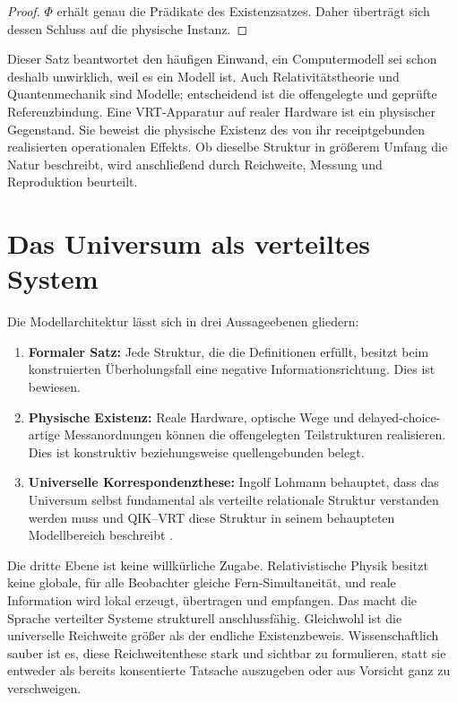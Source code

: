 \documentclass[11pt,a4paper]{article}
\theoremstyle{remark}
\begin{document}
\begin{proof}
\(\Phi\) erhält genau die Prädikate des Existenzsatzes. Daher überträgt sich
dessen Schluss auf die physische Instanz.
\end{proof}

Dieser Satz beantwortet den häufigen Einwand, ein Computermodell sei schon
deshalb unwirklich, weil es ein Modell ist. Auch Relativitätstheorie und
Quantenmechanik sind Modelle; entscheidend ist die offengelegte und geprüfte
Referenzbindung. Eine VRT-Apparatur auf realer Hardware ist ein physischer
Gegenstand. Sie beweist die physische Existenz des von ihr receiptgebunden
realisierten operationalen Effekts. Ob dieselbe Struktur in größerem Umfang
die Natur beschreibt, wird anschließend durch Reichweite, Messung und
Reproduktion beurteilt.

\section{Das Universum als verteiltes System}

Die Modellarchitektur lässt sich in drei Aussageebenen gliedern:

\begin{enumerate}
  \item \textbf{Formaler Satz:} Jede Struktur, die die Definitionen erfüllt,
  besitzt beim konstruierten Überholungsfall eine negative
  Informationsrichtung. Dies ist bewiesen.
  \item \textbf{Physische Existenz:} Reale Hardware, optische Wege und
  delayed-choice-artige Messanordnungen können die offengelegten
  Teilstrukturen realisieren. Dies ist konstruktiv beziehungsweise
  quellengebunden belegt.
  \item \textbf{Universelle Korrespondenzthese:} Ingolf Lohmann behauptet,
  dass das Universum selbst fundamental als verteilte relationale Struktur
  verstanden werden muss und QIK--VRT diese Struktur in seinem behaupteten
  Modellbereich beschreibt \cite{LohmannRoundTrip2026}.
\end{enumerate}

Die dritte Ebene ist keine willkürliche Zugabe. Relativistische Physik besitzt
keine globale, für alle Beobachter gleiche Fern-Simultaneität, und reale
Information wird lokal erzeugt, übertragen und empfangen. Das macht die
Sprache verteilter Systeme strukturell anschlussfähig. Gleichwohl ist die
universelle Reichweite größer als der endliche Existenzbeweis. Wissenschaftlich
sauber ist es, diese Reichweitenthese stark und sichtbar zu formulieren, statt
sie entweder als bereits konsentierte Tatsache auszugeben oder aus Vorsicht
ganz zu verschweigen.
\end{document}
